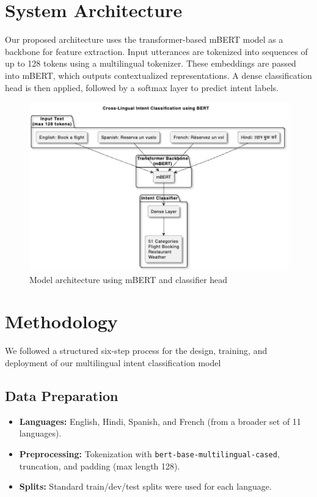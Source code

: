 \documentclass{ecai}
\begin{document}
\section{System Architecture}
Our proposed architecture uses the transformer-based mBERT model as a backbone for feature extraction. Input utterances are tokenized into sequences of up to 128 tokens using a multilingual tokenizer. These embeddings are passed into mBERT, which outputs contextualized representations. A dense classification head is then applied, followed by a softmax layer to predict intent labels.

\begin{figure}[H]
\centering
\includegraphics[width=0.8\linewidth]{architecture.png}
\caption{Model architecture using mBERT and classifier head}
\end{figure}

\section{Methodology}
We followed a structured six-step process for the design, training, and deployment of our multilingual intent classification model

\subsection{Data Preparation}
\begin{itemize}
    \item \textbf{Languages:} English, Hindi, Spanish, and French (from a broader set of 11 languages).
    \item \textbf{Preprocessing:} Tokenization with \texttt{bert-base-multilingual-cased}, truncation, and padding (max length 128).
    \item \textbf{Splits:} Standard train/dev/test splits were used for each language.
\end{itemize}
\end{document}
